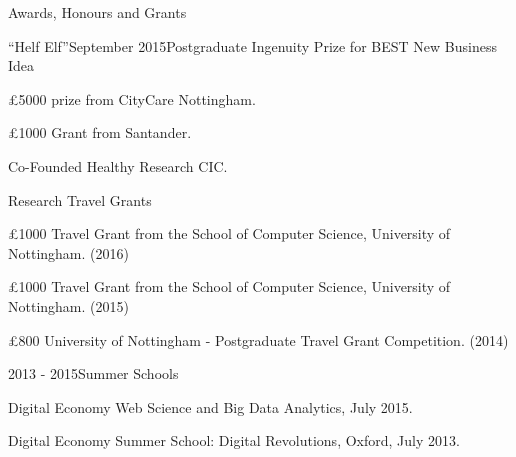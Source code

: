 \documentclass{resume} %
\begin{document}
\begin{rSection}{Awards, Honours and Grants}
    \begin{rSubsection}{``Helf Elf''}{September 2015}{Postgraduate Ingenuity Prize for BEST New Business Idea}{}
        \item \pounds 5000 prize from CityCare Nottingham.
        \item \pounds 1000 Grant from Santander.
        \item Co-Founded Healthy Research CIC.
    \end{rSubsection}
\vspace{-4mm}
    \begin{rSubsection}{}{}{Research Travel Grants}{}
        \item \pounds 1000 Travel Grant from the School of Computer Science, University of Nottingham. (2016)
        \item \pounds 1000 Travel Grant from the School of Computer Science, University of Nottingham. (2015)
        \item \pounds 800 University of Nottingham - Postgraduate Travel Grant Competition. (2014)
    \end{rSubsection}
\vspace{-4 mm}
    \begin{rSubsection}{}{2013 - 2015}{Summer Schools}{}
        \item Digital Economy Web Science and Big Data Analytics, July 2015.
        \item Digital Economy Summer School: Digital Revolutions, Oxford, July 2013.
    \end{rSubsection}

\end{rSection}
\end{document}
